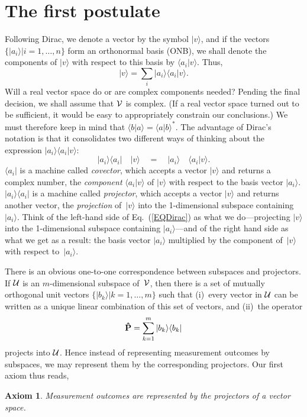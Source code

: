 \documentclass[12pt]{article}
\newtheorem{axiom}{Axiom}
\newcommand{\bax}{\begin{axiom}}
\newcommand{\eax}{\end{axiom}}
\newcommand{\bra}[1]{\langle#1\vert}
\newcommand{\ket}[1]{\vert#1\rangle}
\newcommand{\braket}[2]{\langle#1\vert#2\rangle}
\newcommand{\ketbra}[2]{\vert#1\rangle\langle#2\vert}
\newcommand{\be}{\begin{equation}}
\newcommand{\ee}{\end{equation}}
\newcommand{\cU}{{\cal U}}
\newcommand{\cV}{{\cal V}}
\newcommand{\hP}{{\bf\hat P}}
\begin{document}
\section{The first postulate}
Following Dirac, we denote a vector by the symbol $\ket v$, and if the vectors $\{\ket{a_i}|i=1,\dots,n\}$ form an orthonormal basis (ONB), we shall denote the components of $\ket v$ with respect to this basis by $\braket{a_i}v$. Thus,
\be
\ket v=\sum_i \ket{a_i}\braket{a_i}v.
\ee
Will a real vector space do or are complex components needed? Pending the final decision, we shall assume that $\cV$ is complex. (If a real vector space turned out to be sufficient, it would be easy to appropriately constrain our conclusions.) We must therefore keep in mind that $\braket ba=\braket ab^*$. The advantage of Dirac's notation is that it consolidates two different ways of thinking about the expression $\ket{a_i}\braket{a_i}v$:
\be
\ketbra{a_i}{a_i}\quad\ket v\quad = \quad\ket{a_i}\quad\braket{a_i}v.
\label{EQDirac}
\ee
$\bra{a_i}$ is a machine called \textit{covector}, which accepts a vector $\ket v$ and returns a complex number, the \textit{component} $\braket{a_i}v$ of $\ket v$ with respect to the basis vector $\ket{a_i}$. $\ketbra{a_i}{a_i}$ is a machine called \textit{projector}, which accepts a vector $\ket v$ and returns another vector, the \textit{projection} of~$\ket v$ into the 1-dimensional subspace containing $\ket{a_i}$. Think of the left-hand side of Eq.~(\ref{EQDirac}) as what we do---projecting $\ket v$ into the 1-dimensional subspace containing $\ket{a_i}$---and of the right hand side as what we get as a result: the basis vector $\ket{a_i}$ multiplied by the component of~$\ket v$ with respect to~$\ket{a_i}$.

There is an obvious one-to-one correspondence between subspaces and projectors. If $\cU$ is an $m$-dimensional subspace of~$\cV$, then there is a set of mutually orthogonal unit vectors $\{\ket{b_k}|k=1,\dots,m\}$ such that (i)~every vector in $\cU$ can be written as a unique linear combination of this set of vectors, and (ii)~the operator
\be
\hP=\sum_{k=1}^m \ketbra{b_k}{b_k}
\label{EQprojector}
\ee
projects into $\cU$. Hence instead of representing measurement outcomes by subspaces, we may represent them by the corresponding projectors. Our first axiom thus reads,
\bax
Measurement outcomes are represented by the projectors of a vector space.
\eax
\end{document}

